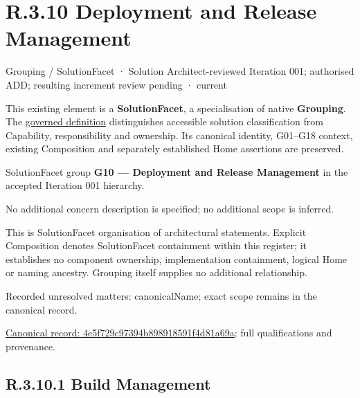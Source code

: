 \section*{R.3.10 Deployment and Release Management}
\label{navigation:R.3.10}

\label{element:4e5f729c97394b898918591f4d81a69a}
{\small Grouping / SolutionFacet · Solution Architect-reviewed Iteration 001; authorised ADD; resulting increment review pending · current}\par

This existing element is a \textbf{SolutionFacet}, a specialisation of native
\textbf{Grouping}. The \href{\detokenize{../../../../../../../governance/continuum-representation.md#solutionfacet-classification--1119-candidate}}{governed definition}
distinguishes accessible solution classification from Capability, responsibility
and ownership. Its canonical identity, G01–G18 context, existing Composition
and separately established Home assertions are preserved.



SolutionFacet group \textbf{G10 — Deployment and Release Management} in the accepted Iteration 001 hierarchy.



No additional concern description is specified; no additional scope is inferred.



This is SolutionFacet organisation of architectural statements. Explicit Composition denotes SolutionFacet containment within this register; it establishes no component ownership, implementation containment, logical Home or naming ancestry. Grouping itself supplies no additional relationship.


{\small Recorded unresolved matters: canonicalName; exact scope remains in the canonical record.}\par
{\footnotesize \href{../../../../../../../continuum/grouping/4e5f729c97394b898918591f4d81a69a.md}{Canonical record: 4e5f729c97394b898918591f4d81a69a}; full qualifications and provenance.}\par
\subsection*{R.3.10.1 Build Management}
\label{navigation:R.3.10.1}

